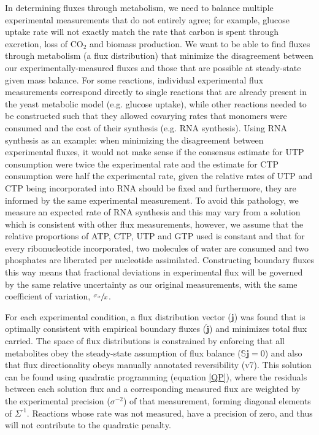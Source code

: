 \documentclass[12pt]{nature}\usepackage{graphicx, color}
\begin{document}
In determining fluxes through metabolism, we need to balance multiple experimental measurements that do not entirely agree; for example, glucose uptake rate will not exactly match the rate that carbon is spent through excretion, loss of CO$_{2}$ and biomass production. We want to be able to find fluxes through metabolism (a flux distribution) that minimize the disagreement between our experimentally-measured fluxes and those that are possible at steady-state given mass balance.  For some reactions, individual experimental flux measurements correspond directly to single reactions that are already present in the yeast metabolic model (e.g. glucose uptake), while other reactions needed to be constructed such that they allowed covarying rates that monomers were consumed and the cost of their synthesis (e.g. RNA synthesis).  Using RNA synthesis as an example: when minimizing the disagreement between experimental fluxes, it would not make sense if the consensus estimate for UTP consumption were twice the experimental rate and the estimate for CTP consumption were half the experimental rate, given the relative rates of UTP and CTP being incorporated into RNA should be fixed and furthermore, they are informed by the same experimental measurement.  To avoid this pathology, we measure an expected rate of RNA synthesis and this may vary from a solution which is consistent with other flux measurements, however, we assume that the relative proportions of ATP, CTP, UTP and GTP used is constant and that for every ribonucleotide incorporated, two molecules of water are consumed and two phosphates are liberated per nucleotide assimilated.  Constructing boundary fluxes this way means that fractional deviations in experimental flux will be governed by the same relative uncertainty as our original measurements, with the same coefficient of variation, $\sfrac{\sigma_{x}}{x}$.

For each experimental condition, a flux distribution vector ($\mathbf{j}$) was found that is optimally consistent with empirical boundary fluxes ($\hat{\mathbf{j}}$) and minimizes total flux carried.  The space of flux distributions is constrained by enforcing that all metabolites obey the steady-state assumption of flux balance ($\mathbb{S}\mathbf{j} = 0$) and also that flux directionality obeys manually annotated reversibility (v7).  This solution can be found using quadratic programming (equation \ref{QP}), where the residuals between each solution flux and a corresponding measured flux are weighted by the experimental precision ($\sigma^{-2}$) of that measurement, forming diagonal elements of $\Sigma^{\text{-}1}$.  Reactions whose rate was not measured, have a precision of zero, and thus will not contribute to the quadratic penalty.
\end{document}
